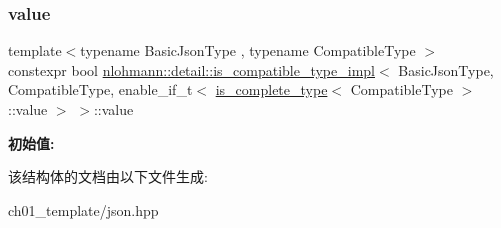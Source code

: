 \subsubsection{\texorpdfstring{value}{value}}
{\footnotesize\ttfamily template$<$typename Basic\+Json\+Type , typename Compatible\+Type $>$ \\
constexpr bool \mbox{\hyperlink{structnlohmann_1_1detail_1_1is__compatible__type__impl}{nlohmann\+::detail\+::is\+\_\+compatible\+\_\+type\+\_\+impl}}$<$ Basic\+Json\+Type, Compatible\+Type, enable\+\_\+if\+\_\+t$<$ \mbox{\hyperlink{structnlohmann_1_1detail_1_1is__complete__type}{is\+\_\+complete\+\_\+type}}$<$ Compatible\+Type $>$\+::value $>$ $>$\+::value\hspace{0.3cm}{\ttfamily [static]}}

{\bfseries 初始值\+:}
\begin{DoxyCode}{0}
\DoxyCodeLine{=}

\end{DoxyCode}


该结构体的文档由以下文件生成\+:\begin{DoxyCompactItemize}
\item 
ch01\+\_\+template/json.\+hpp\end{DoxyCompactItemize}
